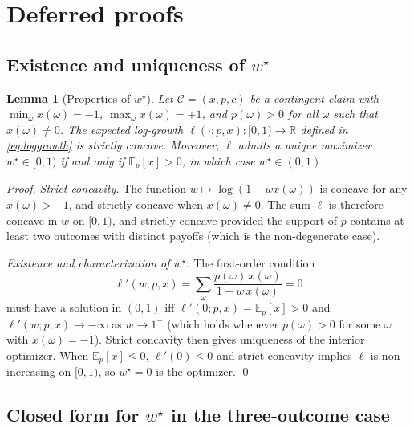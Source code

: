 \documentclass[11pt]{article}
\newtheorem{lemma}[theorem]{Lemma}
\theoremstyle{definition}
\theoremstyle{remark}
\newcommand{\E}{\mathbb{E}}
\newcommand{\R}{\mathbb{R}}
\newcommand{\C}{\mathcal{C}}
\begin{document}
\appendix

\section{Deferred proofs}\label{app:proofs}

\subsection{Existence and uniqueness of \texorpdfstring{$w^\star$}{w-star}}

\begin{lemma}[Properties of $w^\star$]\label{lem:wstar}
Let $\C = (x, p, c)$ be a contingent claim with
$\min_\omega x(\omega) = -1$, $\max_\omega x(\omega) = +1$, and
$p(\omega) > 0$ for all $\omega$ such that $x(\omega) \neq 0$. The
expected log-growth $\ell(\cdot; p, x): [0, 1) \to \R$ defined in
\eqref{eq:loggrowth} is strictly concave. Moreover, $\ell$ admits a unique
maximizer $w^\star \in [0, 1)$ if and only if
$\E_p[x] > 0$, in which case $w^\star \in (0, 1)$.
\end{lemma}

\begin{proof}
\emph{Strict concavity.} The function $w \mapsto \log(1 + w x(\omega))$
is concave for any $x(\omega) > -1$, and strictly concave when
$x(\omega) \neq 0$. The sum $\ell$ is therefore concave in $w$ on
$[0, 1)$, and strictly concave provided the support of $p$ contains at
least two outcomes with distinct payoffs (which is the non-degenerate
case).

\emph{Existence and characterization of $w^\star$.} The first-order
condition
\begin{equation*}
\ell'(w; p, x) = \sum_\omega \frac{p(\omega) \, x(\omega)}{1 + w \, x(\omega)} = 0
\end{equation*}
must have a solution in $(0, 1)$ iff $\ell'(0; p, x) = \E_p[x] > 0$ and
$\ell'(w; p, x) \to -\infty$ as $w \to 1^-$ (which holds whenever
$p(\omega) > 0$ for some $\omega$ with $x(\omega) = -1$). Strict
concavity then gives uniqueness of the interior optimizer. When
$\E_p[x] \le 0$, $\ell'(0) \le 0$ and strict concavity implies $\ell$ is
non-increasing on $[0, 1)$, so $w^\star = 0$ is the optimizer.
\qed
\end{proof}

\subsection{Closed form for \texorpdfstring{$w^\star$}{w-star} in the three-outcome case}
\end{document}
